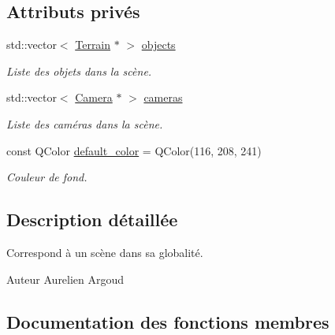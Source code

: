 \subsection*{Attributs privés}
\begin{DoxyCompactItemize}
\item 
\hypertarget{class_scene_abc636ebd2381044849a525ff1c4c3131}{}std\+::vector$<$ \hyperlink{class_terrain}{Terrain} $\ast$ $>$ \hyperlink{class_scene_abc636ebd2381044849a525ff1c4c3131}{objects}\label{class_scene_abc636ebd2381044849a525ff1c4c3131}

\begin{DoxyCompactList}\small\item\em Liste des objets dans la scène. \end{DoxyCompactList}\item 
\hypertarget{class_scene_a766a660b1b9d851b14157a6d9373f719}{}std\+::vector$<$ \hyperlink{class_camera}{Camera} $\ast$ $>$ \hyperlink{class_scene_a766a660b1b9d851b14157a6d9373f719}{cameras}\label{class_scene_a766a660b1b9d851b14157a6d9373f719}

\begin{DoxyCompactList}\small\item\em Liste des caméras dans la scène. \end{DoxyCompactList}\item 
\hypertarget{class_scene_aff17f04cf8feffb105795466c3789197}{}const Q\+Color \hyperlink{class_scene_aff17f04cf8feffb105795466c3789197}{default\+\_\+color} = Q\+Color(116, 208, 241)\label{class_scene_aff17f04cf8feffb105795466c3789197}

\begin{DoxyCompactList}\small\item\em Couleur de fond. \end{DoxyCompactList}\end{DoxyCompactItemize}


\subsection{Description détaillée}
Correspond à un scène dans sa globalité. 

\begin{DoxyAuthor}{Auteur}
Aurelien Argoud 
\end{DoxyAuthor}


\subsection{Documentation des fonctions membres}
\hypertarget{class_scene_af3d56161ec47c25d1bc4eef4c24f8a13}{}
